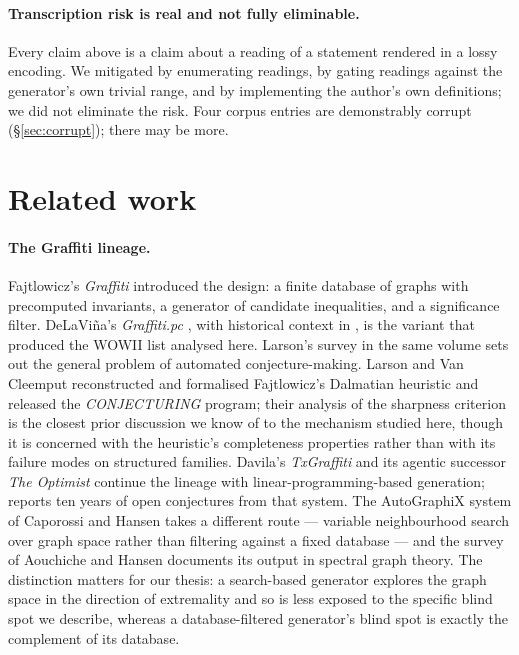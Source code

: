 \documentclass[10pt,a4paper]{article}
\theoremstyle{plain}
\theoremstyle{definition}
\begin{document}
\paragraph{Transcription risk is real and not fully eliminable.} Every claim above is a claim
about a reading of a statement rendered in a lossy encoding. We mitigated by enumerating
readings, by gating readings against the generator's own trivial range, and by implementing the
author's own definitions; we did not eliminate the risk. Four corpus entries are demonstrably
corrupt (\S\ref{sec:corrupt}); there may be more.

\section{Related work}\label{sec:related}

\paragraph{The Graffiti lineage.} Fajtlowicz's \emph{Graffiti} \cite{fajtlowicz1988} introduced
the design: a finite database of graphs with precomputed invariants, a generator of candidate
inequalities, and a significance filter. DeLaVi\~na's \emph{Graffiti.pc}
\cite{delavina2005gpc}, with historical context in \cite{delavina2005history}, is the variant
that produced the WOWII list \cite{wowii} analysed here. Larson's survey
\cite{larson2005survey} in the same volume sets out the general problem of automated
conjecture-making. Larson and Van Cleemput \cite{larsonvancleemput2016} reconstructed and
formalised Fajtlowicz's Dalmatian heuristic and released the \emph{CONJECTURING} program; their
analysis of the sharpness criterion is the closest prior discussion we know of to the mechanism
studied here, though it is concerned with the heuristic's completeness properties rather than
with its failure modes on structured families. Davila's \emph{TxGraffiti}
\cite{davila2026txgraffiti} and its agentic successor \emph{The Optimist} \cite{davila2024optimist}
continue the lineage with linear-programming-based generation; \cite{davilabrimkovpepper2025}
reports ten years of open conjectures from that system. The AutoGraphiX system of Caporossi and
Hansen \cite{caporossihansen2000} takes a different route --- variable neighbourhood search over
graph space rather than filtering against a fixed database --- and the survey of Aouchiche and
Hansen \cite{aouchichehansen2010} documents its output in spectral graph theory. The
distinction matters for our thesis: a search-based generator explores the graph space in the
direction of extremality and so is less exposed to the specific blind spot we describe, whereas
a database-filtered generator's blind spot is exactly the complement of its database.
\end{document}
